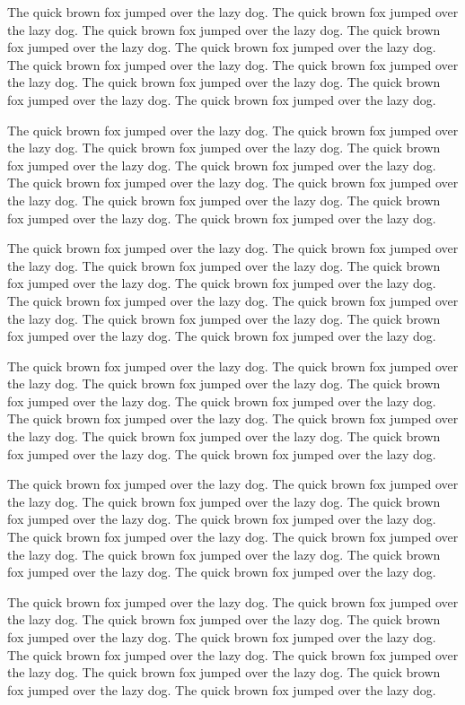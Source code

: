 \documentclass[12pt]{article}
\begin{document}
\addtolength{\textheight}{-.3in}%

The quick brown fox jumped over the lazy dog. The quick brown fox jumped
over the lazy dog. The quick brown fox jumped over the lazy dog. The
quick brown fox jumped over the lazy dog. The quick brown fox jumped
over the lazy dog. The quick brown fox jumped over the lazy dog. The
quick brown fox jumped over the lazy dog. The quick brown fox jumped
over the lazy dog. The quick brown fox jumped over the lazy dog. The
quick brown fox jumped over the lazy dog.

The quick brown fox jumped over the lazy dog. The quick brown fox jumped
over the lazy dog. The quick brown fox jumped over the lazy dog. The
quick brown fox jumped over the lazy dog. The quick brown fox jumped
over the lazy dog. The quick brown fox jumped over the lazy dog. The
quick brown fox jumped over the lazy dog. The quick brown fox jumped
over the lazy dog. The quick brown fox jumped over the lazy dog. The
quick brown fox jumped over the lazy dog.

The quick brown fox jumped over the lazy dog. The quick brown fox jumped
over the lazy dog. The quick brown fox jumped over the lazy dog. The
quick brown fox jumped over the lazy dog. The quick brown fox jumped
over the lazy dog. The quick brown fox jumped over the lazy dog. The
quick brown fox jumped over the lazy dog. The quick brown fox jumped
over the lazy dog. The quick brown fox jumped over the lazy dog. The
quick brown fox jumped over the lazy dog.

The quick brown fox jumped over the lazy dog. The quick brown fox jumped
over the lazy dog. The quick brown fox jumped over the lazy dog. The
quick brown fox jumped over the lazy dog. The quick brown fox jumped
over the lazy dog. The quick brown fox jumped over the lazy dog. The
quick brown fox jumped over the lazy dog. The quick brown fox jumped
over the lazy dog. The quick brown fox jumped over the lazy dog. The
quick brown fox jumped over the lazy dog.

The quick brown fox jumped over the lazy dog. The quick brown fox jumped
over the lazy dog. The quick brown fox jumped over the lazy dog. The
quick brown fox jumped over the lazy dog. The quick brown fox jumped
over the lazy dog. The quick brown fox jumped over the lazy dog. The
quick brown fox jumped over the lazy dog. The quick brown fox jumped
over the lazy dog. The quick brown fox jumped over the lazy dog. The
quick brown fox jumped over the lazy dog.

The quick brown fox jumped over the lazy dog. The quick brown fox jumped
over the lazy dog. The quick brown fox jumped over the lazy dog. The
quick brown fox jumped over the lazy dog. The quick brown fox jumped
over the lazy dog. The quick brown fox jumped over the lazy dog. The
quick brown fox jumped over the lazy dog. The quick brown fox jumped
over the lazy dog. The quick brown fox jumped over the lazy dog. The
quick brown fox jumped over the lazy dog.
\end{document}
